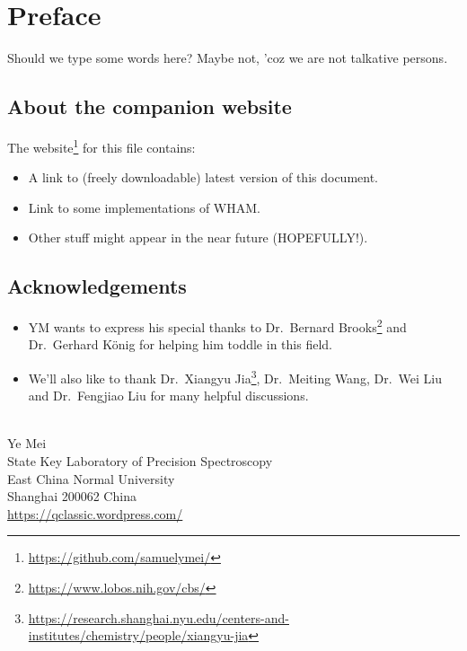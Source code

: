 \chapter*{Preface}
Should we type some words here? Maybe not, 'coz we are not talkative persons.

\section*{About the companion website}
The website\footnote{\url{https://github.com/samuelymei/}} for this file contains:
\begin{itemize}
  \item A link to (freely downloadable) latest version of this document.
  \item Link to some implementations of WHAM.
  \item Other stuff might appear in the near future (HOPEFULLY!).
\end{itemize}

\section*{Acknowledgements}
\begin{itemize}
\item YM wants to express his special thanks to Dr.~Bernard Brooks\footnote{\url{https://www.lobos.nih.gov/cbs/}} and Dr.~Gerhard K\"onig for helping him toddle in this field.
\item We'll also like to thank Dr.~Xiangyu Jia\footnote{\url{https://research.shanghai.nyu.edu/centers-and-institutes/chemistry/people/xiangyu-jia}}, Dr.~Meiting Wang, Dr.~Wei Liu and Dr.~Fengjiao Liu for many helpful discussions.
\end{itemize}
\mbox{}\\
\noindent Ye Mei \\
\noindent State Key Laboratory of Precision Spectroscopy\\
\noindent East China Normal University\\
\noindent Shanghai 200062 China\\
\noindent \url{https://qclassic.wordpress.com/}
